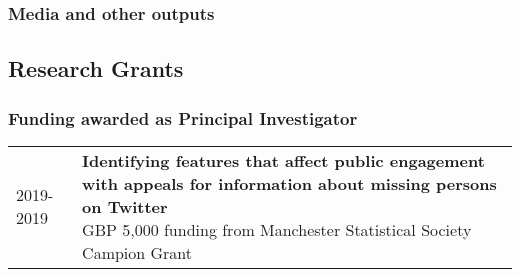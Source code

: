 \documentclass[10pt,a4paper,]{article}
\makeatletter
\newcounter{papers}
\def\briefitem#1#2#3{
#2 & \parbox[t]{0.85\textwidth}{%
      \textbf{#1}\\[-0.1cm]{\footnotesize #3}}\\[0.4cm]}
\def\briefsection#1{\begin{longtable}{@{\extracolsep{\fill}}ll}#1\end{longtable}}
\makeatother
\begin{document}
\hypertarget{media-and-other-outputs}{%
\subsubsection{Media and other outputs}\label{media-and-other-outputs}}

\newrefcontext[sorting=none]\setcounter{papers}{0}\pagebreak[3]
\printbibliography[category=bib-/Users/reka/Dropbox (The University of Manchester)/statistically_insignificant/public/cv/otherpubs.bib-1930582,heading=none]\setcounter{papers}{0}

\nocite{solymosi2019lse,
solymosi2019sagepub,
solymosi2019webinar,
solymosi2019ssi6,
solymosi2018ssi5,
solymosi2018ssi4,
solymosi2018ssi3,
solymosi2018ssi2,
solymosi2018ssi1,
solymosi2016confidence,
solymosia2014mapping,
solymosi2014tsc}

\hypertarget{research-grants}{%
\subsection{Research Grants}\label{research-grants}}

\hypertarget{funding-awarded-as-principal-investigator}{%
\subsubsection{Funding awarded as Principal Investigator}\label{funding-awarded-as-principal-investigator}}

\briefsection{\briefitem{Identifying features that affect public engagement with appeals for information about missing persons on Twitter}{2019-2019}{GBP 5,000 funding from Manchester Statistical Society Campion Grant}\briefitem{Using Bayesian Surprise maps to explore debt and insolvency across the UK}{2018-2019}{GBP 10,000 funding from Consumer Data Research Centre, Economic and Social Research Council}\briefitem{Measuring fear of crime using app-based and sensing methodologies}{2017-2020}{GBP 10,000 funding from British Academy and Leverhulme Small Grants}\briefitem{Building Tools and Training for Crime Analysts using R}{2017-2017}{GBP 3,000 funding from N8 Policing Research Partnership}\briefitem{Data Visualisation in Criminal Courts}{2017-2017}{GBP 1,000 funding from Economic Social Research Council, Festival of Social Sciences}}
\end{document}
